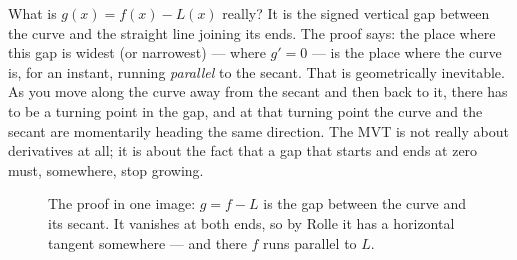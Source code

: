 \begin{happeningbox}
What is $g(x)=f(x)-L(x)$ really? It is the signed vertical gap between the curve and
the straight line joining its ends. The proof says: the place where this gap is
widest (or narrowest) --- where $g'=0$ --- is the place where the curve is, for an
instant, running \emph{parallel} to the secant. That is geometrically inevitable.
As you move along the curve away from the secant and then back to it, there has to
be a turning point in the gap, and at that turning point the curve and the secant
are momentarily heading the same direction. The MVT is not really about
derivatives at all; it is about the fact that a gap that starts and ends at zero
must, somewhere, stop growing.
\end{happeningbox}

\begin{figure}[H]
\centering
{}
\caption{The proof in one image: $g=f-L$ is the gap between the curve and its
secant. It vanishes at both ends, so by Rolle it has a horizontal tangent
somewhere --- and there $f$ runs parallel to $L$.}
\label{ch15:fig-gap}
\end{figure}

